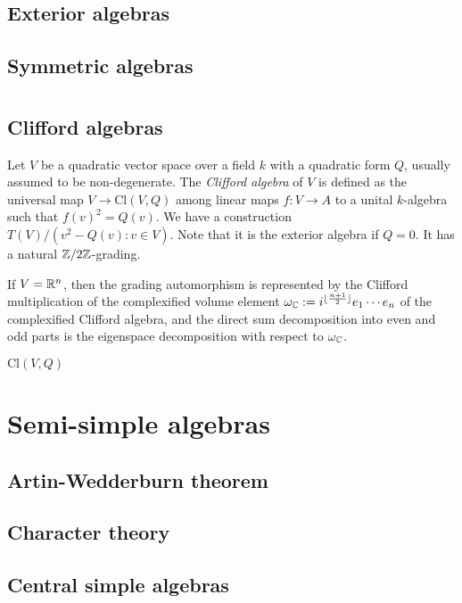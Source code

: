 \documentclass{../../large}
\newcommand{\Cl}{\mathrm{Cl}}
\begin{document}
\section{Exterior algebras}


\begin{prb}[Determinants]
\end{prb}
\section{Symmetric algebras}


\chapter{}

\section{Clifford algebras}

Let $V$ be a quadratic vector space over a field $k$ with a quadratic form $Q$, usually assumed to be non-degenerate.
The \emph{Clifford algebra} of $V$ is defined as the universal map $V\to\Cl(V,Q)$ among linear maps $f:V\to A$ to a unital $k$-algebra such that $f(v)^2=Q(v)$.
We have a construction $T(V)/(v^2-Q(v):v\in V)$.
Note that it is the exterior algebra if $Q=0$.
It has a natural $\mathbb{Z}/2\mathbb{Z}$-grading.

\begin{prb}

If $V=\mathbb{R}^n$, then the grading automorphism is represented by the Clifford multiplication of the complexified volume element $\omega_{\mathbb{C}}:=i^{\lfloor\frac{n+1}2\rfloor}e_1\cdots e_n$ of the complexified Clifford algebra, and the direct sum decomposition into even and odd parts is the eigenspace decomposition with respect to $\omega_{\mathbb{C}}$.

\end{prb}

\begin{prb}[]
$\Cl(V,Q)$

\end{prb}







\chapter{Semi-simple algebras}

\section{Artin-Wedderburn theorem}

\section{Character theory}

\section{Central simple algebras}
\end{document}
